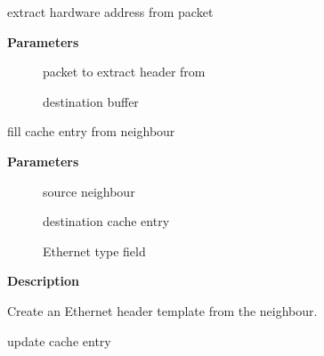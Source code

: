 \documentclass[a4paper,8pt,english]{sphinxmanual}
\begin{document}
\begin{fulllineitems}
\label{networking/kapi:c.eth_header_parse}
extract hardware address from packet

\end{fulllineitems}


\textbf{Parameters}
\begin{description}
\item[{}] \leavevmode
packet to extract header from

\item[{}] \leavevmode
destination buffer

\end{description}

\begin{fulllineitems}
\label{networking/kapi:c.eth_header_cache}
fill cache entry from neighbour

\end{fulllineitems}


\textbf{Parameters}
\begin{description}
\item[{}] \leavevmode
source neighbour

\item[{}] \leavevmode
destination cache entry

\item[{}] \leavevmode
Ethernet type field

\end{description}

\textbf{Description}

Create an Ethernet header template from the neighbour.

\begin{fulllineitems}
\label{networking/kapi:c.eth_header_cache_update}
update cache entry

\end{fulllineitems}
\end{document}
